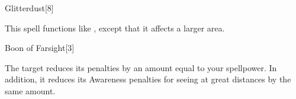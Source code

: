 \begin{spellfooter}
\begin{spellsection}[Greater]{Glitterdust}[8]
    \begin{spellheader}
    \end{spellheader}
    \begin{spellcontent}
        \begin{spelltargetinginfo}
        \end{spelltargetinginfo}
        \begin{spelleffects}
            \spellspecial This spell functions like , except that it affects a larger area.
        \end{spelleffects}
    \end{spellcontent}
    \begin{spellfooter}
        \spellinfo{Conjuration [Creation}{Arcane}
        \miscastyou
    \end{spellfooter}
\end{spellsection}

\begin{spellsection}{Boon of Farsight}[3]
    \begin{spellheader}
    \end{spellheader}
    \begin{spellcontent}
        \begin{spelltargetinginfo}
        \end{spelltargetinginfo}
        \begin{spelleffects}
            \spelleffect The target reduces its  penalties by an amount equal to your spellpower.
            In addition, it reduces its Awareness penalties for seeing at great distances by the same amount.
            \durshort
        \end{spelleffects}
    \end{spellcontent}
    \begin{spellfooter}
        \miscastrandom
    \end{spellfooter}
\end{spellsection}



\end{spellfooter}
